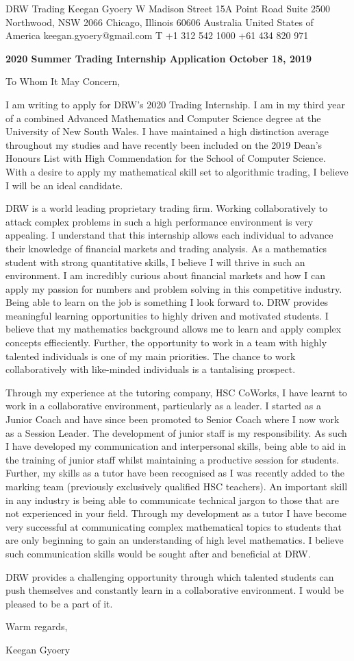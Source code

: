 \documentclass[a4paper,11pt]{article}
\begin{document}
DRW Trading \hfill Keegan Gyoery  W Madison Street \hfill 15A Point Road \break
Suite 2500 \hfill Northwood, NSW 2066 \break
Chicago, Illinois 60606 \hfill Australia \break
United States of America \hfill keegan.gyoery@gmail.com \break
T +1 312 542 1000 \hfill +61 434 820 971 \break

\vspace{5mm}
\textbf{2020 Summer Trading Internship Application October 18, 2019} \par
To Whom It May Concern, \par

I am writing to apply for DRW’s 2020 Trading Internship. I am in my third year of a
combined Advanced Mathematics and Computer Science degree at the University of New South
Wales. I have maintained a high distinction average throughout my studies and have recently been
included on the 2019 Dean’s Honours List with High Commendation for the School of Computer
Science. With a desire to apply my mathematical skill set to algorithmic trading, I believe I will
be an ideal candidate.\par

DRW is a world leading proprietary trading firm. Working collaboratively to attack complex problems in such a high performance environment is very appealing. I understand that this internship allows each individual to advance their knowledge of financial markets and trading analysis. As a mathematics student with strong quantitative skills, I believe I will thrive in such an environment. I am incredibly curious about financial markets and how I can apply my passion for numbers and problem solving in this competitive industry. Being able to learn on the job is something I look forward to. DRW provides meaningful learning opportunities to highly driven and motivated students. I believe that my mathematics background allows me to learn and apply complex concepts effieciently. Further, the opportunity to work in a team with highly talented individuals is one of my main priorities. The chance to work collaboratively with like-minded individuals is a tantalising prospect.

Through my experience at the tutoring company, HSC CoWorks, I have learnt to work in a collaborative environment, particularly as a leader. I started as a Junior Coach and have since been promoted to Senior Coach where I now work as a Session Leader. The development of junior staff is my responsibility. As such I have developed my communication and interpersonal skills, being able to aid in the training of junior staff whilst maintaining a productive session for students. Further, my skills as a tutor have been recognised as I was recently added to the marking team (previously exclusively qualified HSC teachers). An important skill in any industry is being able to communicate technical jargon to those that are not experienced in your field. Through my development as a tutor I have become very successful at communicating complex mathematical topics to students that are only beginning to gain an understanding of high level mathematics. I believe such communication skills would be sought after and beneficial at DRW.\par

DRW provides a challenging opportunity through which talented students can push themselves and constantly learn in a collaborative environment. I would be pleased to be a part of it. \par

Warm regards, \par

Keegan Gyoery
\end{document}
